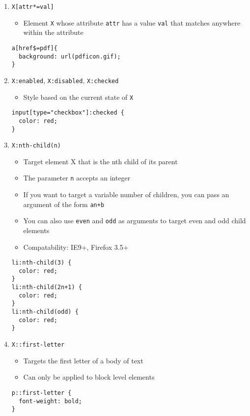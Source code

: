 \documentclass[10pt, twocolumn]{article}
\begin{document}
\begin{enumerate}
\item \texttt{X[attr*=val]}
\begin{itemize}
\item Element \texttt{X} whose attribute \texttt{attr} has a value \texttt{val} that matches anywhere within the attribute 
\end{itemize}
\begin{lstlisting}[frame=single]
a[href$=pdf]{
  background: url(pdficon.gif);
}
\end{lstlisting}

\item \texttt{X:enabled}, \texttt{X:disabled}, \texttt{X:checked} 
\begin{itemize}
\item Style based on the current state of \texttt{X}  
\end{itemize}
\begin{lstlisting}[frame=single]
input[type="checkbox"]:checked {
  color: red;
}
\end{lstlisting}

\item \texttt{X:nth-child(n)} 
\begin{itemize}
\item Target element X that is the nth child of its parent
\item The parameter \texttt{n} accepts an integer
\item If you want to target a variable number of children, you can pass an argument of the form \texttt{an+b}
\item You can also use \texttt{even} and \texttt{odd} as arguments to target even and odd child elements
\item Compatability: IE9+, Firefox 3.5+
\end{itemize}
\begin{lstlisting}[frame=single]
li:nth-child(3) {
  color: red;
}
li:nth-child(2n+1) {
  color: red;
}
li:nth-child(odd) {
  color: red;
}
\end{lstlisting}

\item \texttt{X::first-letter} 
\begin{itemize}
\item Targets the first letter of a body of text
\item Can only be applied to block level elements
\end{itemize}
\begin{lstlisting}[frame=single]
p::first-letter {
  font-weight: bold;
}
\end{lstlisting}

\end{enumerate}
\end{document}
